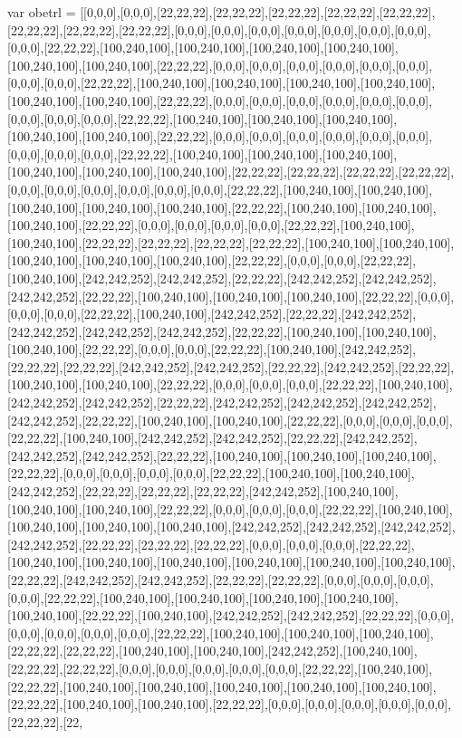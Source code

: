 var obetrl = [[0,0,0],[0,0,0],[22,22,22],[22,22,22],[22,22,22],[22,22,22],[22,22,22],[22,22,22],[22,22,22],[22,22,22],[0,0,0],[0,0,0],[0,0,0],[0,0,0],[0,0,0],[0,0,0],[0,0,0],[0,0,0],[22,22,22],[100,240,100],[100,240,100],[100,240,100],[100,240,100],[100,240,100],[100,240,100],[22,22,22],[0,0,0],[0,0,0],[0,0,0],[0,0,0],[0,0,0],[0,0,0],[0,0,0],[0,0,0],[22,22,22],[100,240,100],[100,240,100],[100,240,100],[100,240,100],[100,240,100],[100,240,100],[22,22,22],[0,0,0],[0,0,0],[0,0,0],[0,0,0],[0,0,0],[0,0,0],[0,0,0],[0,0,0],[0,0,0],[22,22,22],[100,240,100],[100,240,100],[100,240,100],[100,240,100],[100,240,100],[22,22,22],[0,0,0],[0,0,0],[0,0,0],[0,0,0],[0,0,0],[0,0,0],[0,0,0],[0,0,0],[0,0,0],[22,22,22],[100,240,100],[100,240,100],[100,240,100],[100,240,100],[100,240,100],[100,240,100],[22,22,22],[22,22,22],[22,22,22],[22,22,22],[0,0,0],[0,0,0],[0,0,0],[0,0,0],[0,0,0],[0,0,0],[22,22,22],[100,240,100],[100,240,100],[100,240,100],[100,240,100],[100,240,100],[22,22,22],[100,240,100],[100,240,100],[100,240,100],[22,22,22],[0,0,0],[0,0,0],[0,0,0],[0,0,0],[22,22,22],[100,240,100],[100,240,100],[22,22,22],[22,22,22],[22,22,22],[22,22,22],[100,240,100],[100,240,100],[100,240,100],[100,240,100],[100,240,100],[22,22,22],[0,0,0],[0,0,0],[22,22,22],[100,240,100],[242,242,252],[242,242,252],[22,22,22],[242,242,252],[242,242,252],[242,242,252],[22,22,22],[100,240,100],[100,240,100],[100,240,100],[22,22,22],[0,0,0],[0,0,0],[0,0,0],[22,22,22],[100,240,100],[242,242,252],[22,22,22],[242,242,252],[242,242,252],[242,242,252],[242,242,252],[22,22,22],[100,240,100],[100,240,100],[100,240,100],[22,22,22],[0,0,0],[0,0,0],[22,22,22],[100,240,100],[242,242,252],[22,22,22],[22,22,22],[242,242,252],[242,242,252],[22,22,22],[242,242,252],[22,22,22],[100,240,100],[100,240,100],[22,22,22],[0,0,0],[0,0,0],[0,0,0],[22,22,22],[100,240,100],[242,242,252],[242,242,252],[22,22,22],[242,242,252],[242,242,252],[242,242,252],[242,242,252],[22,22,22],[100,240,100],[100,240,100],[22,22,22],[0,0,0],[0,0,0],[0,0,0],[22,22,22],[100,240,100],[242,242,252],[242,242,252],[22,22,22],[242,242,252],[242,242,252],[242,242,252],[22,22,22],[100,240,100],[100,240,100],[100,240,100],[22,22,22],[0,0,0],[0,0,0],[0,0,0],[0,0,0],[22,22,22],[100,240,100],[100,240,100],[242,242,252],[22,22,22],[22,22,22],[22,22,22],[242,242,252],[100,240,100],[100,240,100],[100,240,100],[22,22,22],[0,0,0],[0,0,0],[0,0,0],[22,22,22],[100,240,100],[100,240,100],[100,240,100],[100,240,100],[242,242,252],[242,242,252],[242,242,252],[242,242,252],[22,22,22],[22,22,22],[22,22,22],[0,0,0],[0,0,0],[0,0,0],[22,22,22],[100,240,100],[100,240,100],[100,240,100],[100,240,100],[100,240,100],[100,240,100],[22,22,22],[242,242,252],[242,242,252],[22,22,22],[22,22,22],[0,0,0],[0,0,0],[0,0,0],[0,0,0],[22,22,22],[100,240,100],[100,240,100],[100,240,100],[100,240,100],[100,240,100],[22,22,22],[100,240,100],[242,242,252],[242,242,252],[22,22,22],[0,0,0],[0,0,0],[0,0,0],[0,0,0],[0,0,0],[22,22,22],[100,240,100],[100,240,100],[100,240,100],[22,22,22],[22,22,22],[100,240,100],[100,240,100],[242,242,252],[100,240,100],[22,22,22],[22,22,22],[0,0,0],[0,0,0],[0,0,0],[0,0,0],[0,0,0],[22,22,22],[100,240,100],[22,22,22],[100,240,100],[100,240,100],[100,240,100],[100,240,100],[100,240,100],[22,22,22],[100,240,100],[100,240,100],[22,22,22],[0,0,0],[0,0,0],[0,0,0],[0,0,0],[0,0,0],[22,22,22],[22,